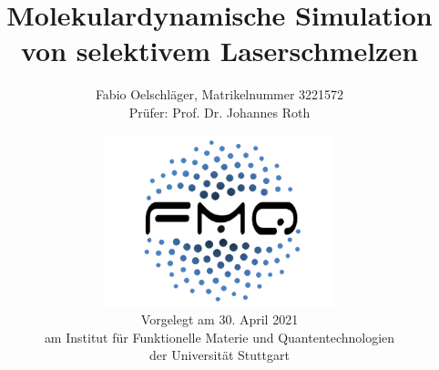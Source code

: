 \documentclass{thesis}
\title{Molekulardynamische Simulation von selektivem Laserschmelzen}
\author{
	Fabio Oelschläger, Matrikelnummer 3221572\\
	Prüfer: Prof. Dr. Johannes Roth
}
\date{
	\vspace{1cm}
	\includegraphics[width=0.5\textwidth]{fmq-logo.png}\\
	\vspace{1cm}
	Vorgelegt am 30. April 2021\\
	am Institut für Funktionelle Materie und Quantentechnologien\\
	der Universität Stuttgart
}
\begin{document}
	\frontmatter
	\begin{titlepage}
		\maketitle
	\end{titlepage}

	

	\tableofcontents
	\listoftodos

	\mainmatter
	

	\backmatter
	
\end{document}
